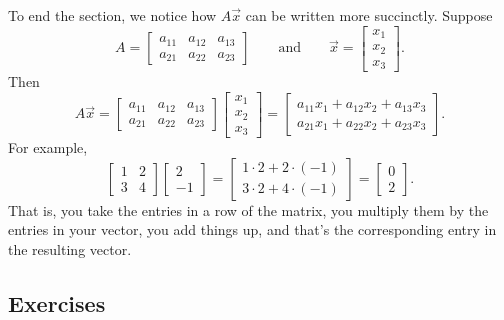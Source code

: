 To end the section, we notice how $A \vec{x}$ can be written more succinctly.
Suppose
\begin{equation*}
A =
\begin{bmatrix}
a_{11} & a_{12} & a_{13} \\
a_{21} & a_{22} & a_{23}
\end{bmatrix}
\qquad \text{and} \qquad
\vec{x} =
\begin{bmatrix}
x_1 \\ x_2 \\ x_3
\end{bmatrix} .
\end{equation*}
Then
\begin{equation*}
A \vec{x} =
\begin{bmatrix}
a_{11} & a_{12} & a_{13} \\
a_{21} & a_{22} & a_{23}
\end{bmatrix}
\begin{bmatrix}
x_1 \\ x_2 \\ x_3
\end{bmatrix}
=
\begin{bmatrix}
a_{11} x_1 + a_{12} x_2 + a_{13} x_3 \\
a_{21} x_1 + a_{22} x_2 + a_{23} x_3
\end{bmatrix}  .
\end{equation*}
For example,
\begin{equation*}
\begin{bmatrix}
1 & 2 \\ 3 & 4
\end{bmatrix}
\begin{bmatrix}
2 \\ -1
\end{bmatrix}
=
\begin{bmatrix}
1 \cdot 2 + 2 \cdot (-1) \\
3 \cdot 2 + 4 \cdot (-1)
\end{bmatrix}
=
\begin{bmatrix}
0 \\ 2
\end{bmatrix}  .
\end{equation*}
That is, you take the entries in a row of the matrix, you multiply them by the
entries in your vector, you add things up, and that's the corresponding
entry in the resulting vector.


\subsection{Exercises}

